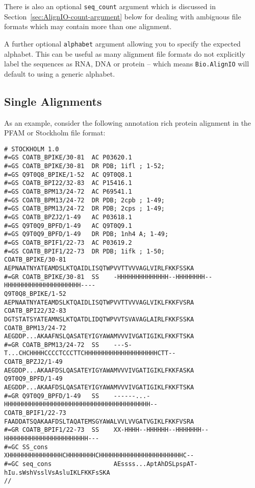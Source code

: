 \documentclass{report}
\begin{document}
\noindent There is also an optional \verb|seq_count| argument which is discussed in Section~\ref{sec:AlignIO-count-argument} below for dealing with ambiguous file formats which may contain more than one alignment.

A further optional \verb|alphabet| argument allowing you to specify the expected alphabet. This can be useful as many alignment file formats do not explicitly label the sequences as RNA, DNA or protein -- which means \verb|Bio.AlignIO| will default to using a generic alphabet.

\subsection{Single Alignments}
As an example, consider the following annotation rich protein alignment in the PFAM or Stockholm file format:

\begin{verbatim}
# STOCKHOLM 1.0
#=GS COATB_BPIKE/30-81  AC P03620.1
#=GS COATB_BPIKE/30-81  DR PDB; 1ifl ; 1-52;
#=GS Q9T0Q8_BPIKE/1-52  AC Q9T0Q8.1
#=GS COATB_BPI22/32-83  AC P15416.1
#=GS COATB_BPM13/24-72  AC P69541.1
#=GS COATB_BPM13/24-72  DR PDB; 2cpb ; 1-49;
#=GS COATB_BPM13/24-72  DR PDB; 2cps ; 1-49;
#=GS COATB_BPZJ2/1-49   AC P03618.1
#=GS Q9T0Q9_BPFD/1-49   AC Q9T0Q9.1
#=GS Q9T0Q9_BPFD/1-49   DR PDB; 1nh4 A; 1-49;
#=GS COATB_BPIF1/22-73  AC P03619.2
#=GS COATB_BPIF1/22-73  DR PDB; 1ifk ; 1-50;
COATB_BPIKE/30-81             AEPNAATNYATEAMDSLKTQAIDLISQTWPVVTTVVVAGLVIRLFKKFSSKA
#=GR COATB_BPIKE/30-81  SS    -HHHHHHHHHHHHHH--HHHHHHHH--HHHHHHHHHHHHHHHHHHHHH----
Q9T0Q8_BPIKE/1-52             AEPNAATNYATEAMDSLKTQAIDLISQTWPVVTTVVVAGLVIKLFKKFVSRA
COATB_BPI22/32-83             DGTSTATSYATEAMNSLKTQATDLIDQTWPVVTSVAVAGLAIRLFKKFSSKA
COATB_BPM13/24-72             AEGDDP...AKAAFNSLQASATEYIGYAWAMVVVIVGATIGIKLFKKFTSKA
#=GR COATB_BPM13/24-72  SS    ---S-T...CHCHHHHCCCCTCCCTTCHHHHHHHHHHHHHHHHHHHHCTT--
COATB_BPZJ2/1-49              AEGDDP...AKAAFDSLQASATEYIGYAWAMVVVIVGATIGIKLFKKFASKA
Q9T0Q9_BPFD/1-49              AEGDDP...AKAAFDSLQASATEYIGYAWAMVVVIVGATIGIKLFKKFTSKA
#=GR Q9T0Q9_BPFD/1-49   SS    ------...-HHHHHHHHHHHHHHHHHHHHHHHHHHHHHHHHHHHHHHHH--
COATB_BPIF1/22-73             FAADDATSQAKAAFDSLTAQATEMSGYAWALVVLVVGATVGIKLFKKFVSRA
#=GR COATB_BPIF1/22-73  SS    XX-HHHH--HHHHHH--HHHHHHH--HHHHHHHHHHHHHHHHHHHHHHH---
#=GC SS_cons                  XHHHHHHHHHHHHHHHCHHHHHHHHCHHHHHHHHHHHHHHHHHHHHHHHC--
#=GC seq_cons                 AEssss...AptAhDSLpspAT-hIu.sWshVsslVsAsluIKLFKKFsSKA
//
\end{verbatim}
\end{document}
